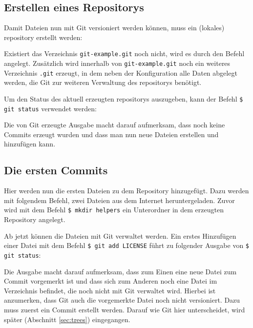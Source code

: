 \subsection{Erstellen eines Repositorys}\label{startup}
Damit Dateien nun mit Git versioniert werden können, muss ein (lokales)
\gls{repository} erstellt werden:


Existiert das Verzeichnis \texttt{git-example.git} noch nicht, wird es durch
den Befehl angelegt. Zusätzlich wird innerhalb von \texttt{git-example.git}
noch ein weiteres Verzeichnis \texttt{.git} erzeugt, in dem neben der
Konfiguration alle Daten abgelegt werden, die Git zur weiteren Verwaltung des
\glspl{repository} benötigt.

Um den Status des aktuell erzeugten \glspl{repository} auszugeben, kann der
Befehl \texttt{\$ git status} verwendet werden:


Die von Git erzeugte Ausgabe macht darauf aufmerksam, dass noch keine Commits
erzeugt wurden und dass man nun neue Dateien erstellen und hinzufügen kann.

\subsection{Die ersten Commits}\label{sec:first_commits}

Hier werden nun die ersten Dateien zu dem Repository hinzugefügt. Dazu werden
mit folgendem Befehl, zwei Dateien aus dem Internet heruntergeladen. Zuvor wird
mit dem Befehl \texttt{\$ mkdir helpers} ein Unterordner in dem erzeugten
Repository angelegt.


Ab jetzt können die Dateien mit Git verwaltet werden. Ein erstes Hinzufügen
einer Datei mit dem Befehl \texttt{\$ git add LICENSE} führt zu folgender
Ausgabe von \texttt{\$ git status}:


Die Ausgabe macht darauf aufmerksam, dass zum Einen eine neue Datei zum Commit
vorgemerkt ist und dass sich zum Anderen noch eine Datei im Verzeichnis
befindet, die noch nicht mit Git verwaltet wird. Hierbei ist anzumerken, dass
Git auch die vorgemerkte Datei noch nicht versioniert. Dazu muss zuerst ein
Commit erstellt werden. Darauf wie Git hier unterscheidet, wird später
(Abschnitt \ref{sec:trees}) eingegangen.

